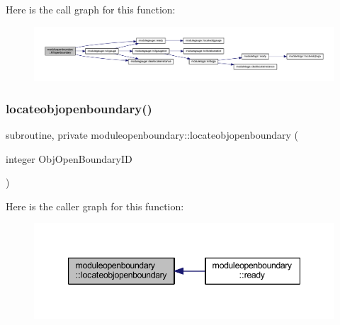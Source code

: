 Here is the call graph for this function\+:\nopagebreak
\begin{figure}[H]
\begin{center}
\leavevmode
\includegraphics[width=350pt]{namespacemoduleopenboundary_aeb84e486854c5a1124aae3804680b09b_cgraph}
\end{center}
\end{figure}
\mbox{\label{namespacemoduleopenboundary_a574d2a20bc25ffca8219ecde4cb1c29f}} 
\subsubsection{\texorpdfstring{locateobjopenboundary()}{locateobjopenboundary()}}
{\footnotesize\ttfamily subroutine, private moduleopenboundary\+::locateobjopenboundary (\begin{DoxyParamCaption}\item[{integer}]{Obj\+Open\+Boundary\+ID }\end{DoxyParamCaption})\hspace{0.3cm}{\ttfamily [private]}}

Here is the caller graph for this function\+:\nopagebreak
\begin{figure}[H]
\begin{center}
\leavevmode
\includegraphics[width=347pt]{namespacemoduleopenboundary_a574d2a20bc25ffca8219ecde4cb1c29f_icgraph}
\end{center}
\end{figure}
\mbox{\label{namespacemoduleopenboundary_aff2a2f4ab16c35a036f9e00575fed103}} 
